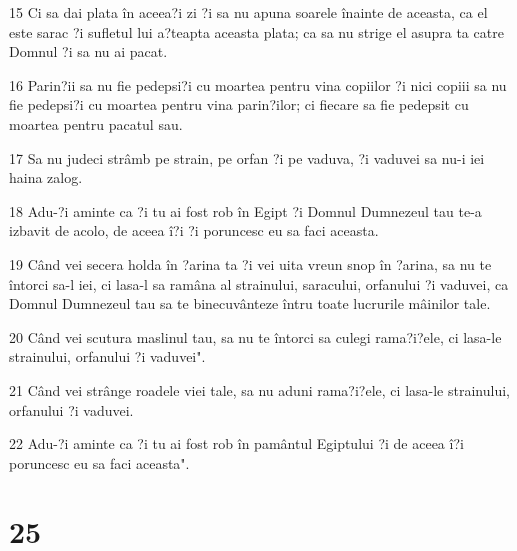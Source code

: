 \par 15 Ci sa dai plata în aceea?i zi ?i sa nu apuna soarele înainte de aceasta, ca el este sarac ?i sufletul lui a?teapta aceasta plata; ca sa nu strige el asupra ta catre Domnul ?i sa nu ai pacat.
\par 16 Parin?ii sa nu fie pedepsi?i cu moartea pentru vina copiilor ?i nici copiii sa nu fie pedepsi?i cu moartea pentru vina parin?ilor; ci fiecare sa fie pedepsit cu moartea pentru pacatul sau.
\par 17 Sa nu judeci strâmb pe strain, pe orfan ?i pe vaduva, ?i vaduvei sa nu-i iei haina zalog.
\par 18 Adu-?i aminte ca ?i tu ai fost rob în Egipt ?i Domnul Dumnezeul tau te-a izbavit de acolo, de aceea î?i ?i poruncesc eu sa faci aceasta.
\par 19 Când vei secera holda în ?arina ta ?i vei uita vreun snop în ?arina, sa nu te întorci sa-l iei, ci lasa-l sa ramâna al strainului, saracului, orfanului ?i vaduvei, ca Domnul Dumnezeul tau sa te binecuvânteze întru toate lucrurile mâinilor tale.
\par 20 Când vei scutura maslinul tau, sa nu te întorci sa culegi rama?i?ele, ci lasa-le strainului, orfanului ?i vaduvei".
\par 21 Când vei strânge roadele viei tale, sa nu aduni rama?i?ele, ci lasa-le strainului, orfanului ?i vaduvei.
\par 22 Adu-?i aminte ca ?i tu ai fost rob în pamântul Egiptului ?i de aceea î?i poruncesc eu sa faci aceasta".

\chapter{25}

